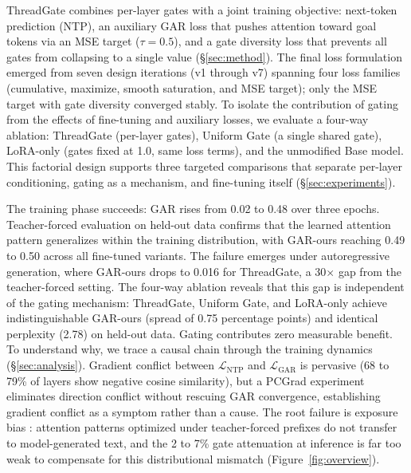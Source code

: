 ThreadGate combines per-layer gates with a joint training objective: next-token prediction (NTP), an auxiliary GAR loss that pushes attention toward goal tokens via an MSE target ($\tau = 0.5$), and a gate diversity loss that prevents all gates from collapsing to a single value (\S\ref{sec:method}). The final loss formulation emerged from seven design iterations (v1 through v7) spanning four loss families (cumulative, maximize, smooth saturation, and MSE target); only the MSE target with gate diversity converged stably. To isolate the contribution of gating from the effects of fine-tuning and auxiliary losses, we evaluate a four-way ablation: ThreadGate (per-layer gates), Uniform Gate (a single shared gate), LoRA-only (gates fixed at 1.0, same loss terms), and the unmodified Base model. This factorial design supports three targeted comparisons that separate per-layer conditioning, gating as a mechanism, and fine-tuning itself (\S\ref{sec:experiments}).

The training phase succeeds: GAR rises from 0.02 to 0.48 over three epochs. Teacher-forced evaluation on held-out data confirms that the learned attention pattern generalizes within the training distribution, with GAR-ours reaching 0.49 to 0.50 across all fine-tuned variants. The failure emerges under autoregressive generation, where GAR-ours drops to 0.016 for ThreadGate, a 30$\times$ gap from the teacher-forced setting. The four-way ablation reveals that this gap is independent of the gating mechanism: ThreadGate, Uniform Gate, and LoRA-only achieve indistinguishable GAR-ours (spread of 0.75 percentage points) and identical perplexity (2.78) on held-out data. Gating contributes zero measurable benefit. To understand why, we trace a causal chain through the training dynamics (\S\ref{sec:analysis}). Gradient conflict between $\mathcal{L}_\text{NTP}$ and $\mathcal{L}_\text{GAR}$ is pervasive (68 to 79\% of layers show negative cosine similarity), but a PCGrad \citep{yu2020pcgrad} experiment eliminates direction conflict without rescuing GAR convergence, establishing gradient conflict as a symptom rather than a cause. The root failure is exposure bias \citep{bengio2015scheduled}: attention patterns optimized under teacher-forced prefixes do not transfer to model-generated text, and the 2 to 7\% gate attenuation at inference is far too weak to compensate for this distributional mismatch (Figure~\ref{fig:overview}).

